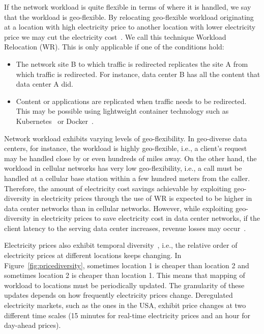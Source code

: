 If the network workload is quite flexible in terms of where it is handled, we say that the workload is geo-flexible. By relocating geo-flexible workload originating at a location with high electricity price to another location with lower electricity price we may cut the electricity cost~\cite{Li:Optimal:TSG:2012,LinInfocom11,serverEnergy,Mazzucco2012415,rao2010,qureshi2009cutting}. We call this technique Workload Relocation (WR). This is only applicable if one of the conditions hold:

\begin{itemize}
\item The network site B to which traffic is redirected replicates the site A from which traffic is redirected. For instance, data center B has all the content that data center A did.
\item Content or applications are replicated when traffic needs to be redirected. This may be possible using lightweight container technology such as Kubernetes~\cite{kubernetes} or Docker~\cite{docker}.
\end{itemize}

Network workload exhibits varying levels of geo-flexibility. In geo-diverse data centers, for instance, the workload is highly geo-flexible, i.e., a client's request may be handled close by or even hundreds of miles away. On the other hand, the workload in cellular networks has very low geo-flexibility, i.e., a call must be handled at a cellular base station within a few hundred meters from the caller. Therefore, the amount of electricity cost savings achievable by exploiting geo-diversity in electricity prices through the use of WR is expected to be higher in data center networks than in cellular networks. However, while exploiting geo-diversity in electricity prices to save electricity cost in data center networks, if the client latency to the serving data center increases, revenue losses may occur~\cite{schurman:latencycost:2009:velocity,dixon:latencycost:2009:velocity,artz:latencycost:2009:velocity}.

Electricity prices also exhibit temporal diversity~\cite{qureshiHotnets}, i.e., the relative order of electricity prices at different locations keeps changing. In Figure~\ref{fig:pricediversity}, sometimes location 1 is cheaper than location 2 and sometimes location 2 is cheaper than location 1.  This means that mapping of workload to locations must be periodically updated. The granularity of these updates depends on how frequently electricity prices change. Deregulated electricity markets, such as the ones in the USA, exhibit price changes at two different time scales (15 minutes for real-time electricity prices and an hour for day-ahead prices). 

